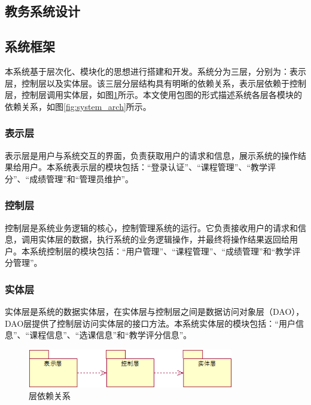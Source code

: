 \begin{center}
  \section{教务系统设计}
\end{center}

\subsection{系统框架}\label{sec:system_frame}
本系统基于层次化、模块化的思想进行搭建和开发。系统分为三层，分别为：表示层，控制层以及实体层。该三层分层结构具有明晰的依赖关系，表示层依赖于控制层，控制层调用实体层，如图\ref{fig:level_depend}所示。本文使用包图的形式描述系统各层各模块的依赖关系，如图\ref{fig:system_arch}所示。

\subsubsection{表示层}
  
表示层是用户与系统交互的界面，负责获取用户的请求和信息，展示系统的操作结果给用户。本系统表示层的模块包括：“登录认证”、“课程管理”、“教学评分”、“成绩管理”和“管理员维护”。
  
\subsubsection{控制层}
  
控制层是系统业务逻辑的核心，控制管理系统的运行。它负责接收用户的请求和信息，调用实体层的数据，执行系统的业务逻辑操作，并最终将操作结果返回给用户。本系统控制层的模块包括：“用户管理”、“课程管理”、“成绩管理”和“教学评分管理”。
  
\subsubsection{实体层}
  
实体层是系统的数据实体层，在实体层与控制层之间是数据访问对象层（DAO），DAO层提供了控制层访问实体层的接口方法。本系统实体层的模块包括：“用户信息”、“课程信息”、“选课信息”和“教学评分信息”。

\begin{figure}[H]
  \centering
  \includegraphics[width=0.8\textwidth]{img/level_depend}
  \caption{层依赖关系}
  \label{fig:level_depend}
\end{figure}

